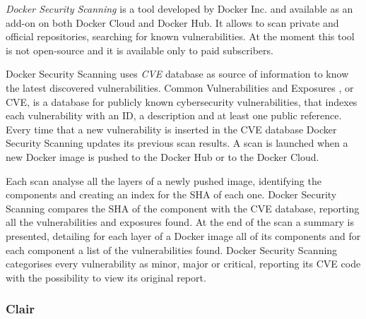 \documentclass[a4paper,12pt]{article}
\begin{document}
\textit{Docker Security Scanning} \cite{docker_security_scanning} is a tool
developed by Docker Inc. and available as an add-on on both Docker Cloud and
Docker Hub. It allows to scan private and official repositories, searching for
known vulnerabilities. At the moment this tool is not open-source and it is
available only to paid subscribers. \par Docker Security Scanning uses
\textit{CVE} database as source of information to know the latest discovered
vulnerabilities. Common Vulnerabilities and Exposures
\cite{common_vulnerabilities_exposures}, or CVE, is a database for publicly
known cybersecurity vulnerabilities, that indexes each vulnerability with an
ID, a description and at least one public reference. Every time that a new
vulnerability is inserted in the CVE database Docker Security Scanning updates
its previous scan results. A scan is launched when a new Docker image is pushed
to the Docker Hub or to the Docker Cloud. \par Each scan analyse all the layers
of a newly pushed image, identifying the components and creating an index for the
SHA of each one. Docker Security Scanning compares the SHA of the component with
the CVE database, reporting all the vulnerabilities and exposures found. At the
end of the scan a summary is presented, detailing for each layer of a Docker
image all of its components and for each component a list of the vulnerabilities
found. Docker Security Scanning categorises every vulnerability as minor, major
or critical, reporting its CVE code with the possibility to view its original
report.  

\subsubsection{Clair}
\end{document}
